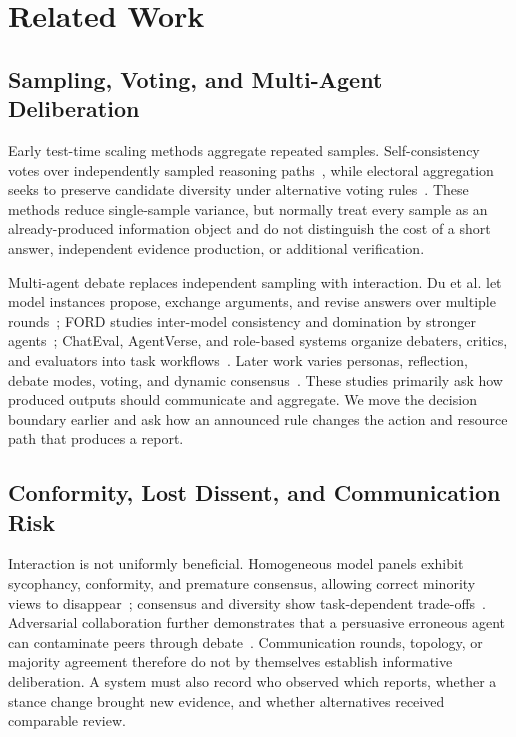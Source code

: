 \section{Related Work}\label{sec:related}

\subsection{Sampling, Voting, and Multi-Agent Deliberation}
Early test-time scaling methods aggregate repeated samples. Self-consistency votes over independently sampled reasoning paths~\cite{wang2023selfconsistency}, while electoral aggregation seeks to preserve candidate diversity under alternative voting rules~\cite{zhao2024electoral}. These methods reduce single-sample variance, but normally treat every sample as an already-produced information object and do not distinguish the cost of a short answer, independent evidence production, or additional verification.

Multi-agent debate replaces independent sampling with interaction. Du et al. let model instances propose, exchange arguments, and revise answers over multiple rounds~\cite{du2024improving}; FORD studies inter-model consistency and domination by stronger agents~\cite{xiong2023interconsistency}; ChatEval, AgentVerse, and role-based systems organize debaters, critics, and evaluators into task workflows~\cite{chan2023chateval,chen2023agentverse}. Later work varies personas, reflection, debate modes, voting, and dynamic consensus~\cite{zhang2024collaboration,choi2025debate,li2025dynamic}. These studies primarily ask how produced outputs should communicate and aggregate. We move the decision boundary earlier and ask how an announced rule changes the action and resource path that produces a report.

\subsection{Conformity, Lost Dissent, and Communication Risk}
Interaction is not uniformly beneficial. Homogeneous model panels exhibit sycophancy, conformity, and premature consensus, allowing correct minority views to disappear~\cite{pitre2025consensagent,swamy2025peacemaker}; consensus and diversity show task-dependent trade-offs~\cite{wu2025disagreement}. Adversarial collaboration further demonstrates that a persuasive erroneous agent can contaminate peers through debate~\cite{amayuelas2024multiagent}. Communication rounds, topology, or majority agreement therefore do not by themselves establish informative deliberation. A system must also record who observed which reports, whether a stance change brought new evidence, and whether alternatives received comparable review.

